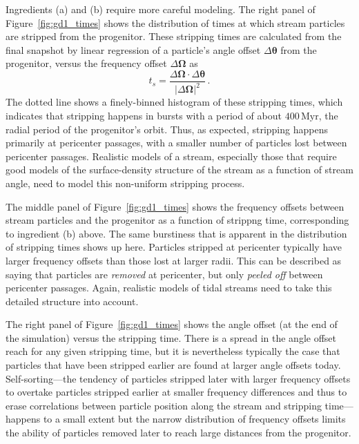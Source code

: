 \documentclass[12pt,preprint]{aastex}
\renewcommand{\figurename}{Figure}
\renewcommand{\vec}[1]{\ensuremath{\mathbf{#1}}}
\newcommand{\veco}{\ensuremath{\vec{\Omega}}}
\newcommand{\veca}{\ensuremath{\boldsymbol\theta}}
\newcommand{\Myr}{\ensuremath{\,\mathrm{Myr}}}
\newcommand{\ts}{\ensuremath{t_s}}
\begin{document}
Ingredients (a) and (b) require more careful modeling. The right panel
of \figurename~\ref{fig:gd1_times} shows the distribution of times at
which stream particles are stripped from the progenitor. These
stripping times are calculated from the final snapshot by linear
regression of a particle's angle offset $\Delta \veca$ from the
progenitor, versus the frequency offset $\Delta \veco$ as 
\begin{equation}
  \ts = \frac{\Delta \veco \cdot \Delta \veca}{|\Delta \veco|^2}\,.
\end{equation}
The dotted line shows a finely-binned histogram of these stripping
times, which indicates that stripping happens in bursts with a period
of about $400\Myr$, the radial period of the progenitor's orbit. Thus,
as expected, stripping happens primarily at pericenter passages, with
a smaller number of particles lost between pericenter
passages. Realistic models of a stream, especially those that require
good models of the surface-density structure of the stream as a
function of stream angle, need to model this non-uniform stripping
process.

The middle panel of \figurename~\ref{fig:gd1_times} shows the
frequency offsets between stream particles and the progenitor as a
function of strippng time, corresponding to ingredient (b) above. The
same burstiness that is apparent in the distribution of stripping
times shows up here. Particles stripped at pericenter typically have
larger frequency offsets than those lost at larger radii. This can be
described as saying that particles are \emph{removed} at pericenter,
but only \emph{peeled off} between pericenter passages. Again,
realistic models of tidal streams need to take this detailed structure
into account.

The right panel of \figurename~\ref{fig:gd1_times} shows the angle
offset (at the end of the simulation) versus the stripping time. There
is a spread in the angle offset reach for any given stripping time,
but it is nevertheless typically the case that particles that have
been stripped earlier are found at larger angle offsets
today. Self-sorting---the tendency of particles stripped later with
larger frequency offsets to overtake particles stripped earlier at
smaller frequency differences and thus to erase correlations between
particle position along the stream and stripping time---happens to a
small extent but the narrow distribution of frequency offsets limits
the ability of particles removed later to reach large distances from
the progenitor.
\end{document}
